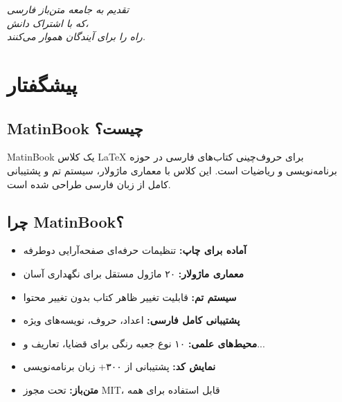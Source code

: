 \documentclass{matinbook}
\begin{document}
    \thispagestyle{empty}
    \vfill
    \begin{flushright}
        {\Large\itshape
            تقدیم به جامعه متن‌باز فارسی\\
            که با اشتراک دانش،\\
            راه را برای آیندگان هموار می‌کنند.
        }
    \end{flushright}
    \clearpage
    \frontmatter
    
    \chapter*{پیشگفتار}
    
    \section*{MatinBook چیست؟}
    
    MatinBook یک کلاس \LaTeX{}
    برای حروف‌چینی کتاب‌های فارسی در حوزه
    برنامه‌نویسی و ریاضیات است. این کلاس
    با معماری ماژولار، سیستم تم و پشتیبانی
    کامل از زبان فارسی طراحی شده است.
    
    \section*{چرا MatinBook؟}
    
    \begin{itemize}
        \item \textbf{آماده برای چاپ:}
        تنظیمات حرفه‌ای صفحه‌آرایی دوطرفه
        
        \item \textbf{معماری ماژولار:}
        ۲۰ ماژول مستقل برای نگهداری آسان
        
        \item \textbf{سیستم تم:}
        قابلیت تغییر ظاهر کتاب بدون تغییر محتوا
        
        \item \textbf{پشتیبانی کامل فارسی:}
        اعداد، حروف، نویسه‌های ویژه
        
        \item \textbf{محیط‌های علمی:}
        ۱۰ نوع جعبه رنگی برای قضایا، تعاریف و...
        
        \item \textbf{نمایش کد:}
        پشتیبانی از ۳۰۰+ زبان برنامه‌نویسی
        
        \item \textbf{متن‌باز:}
        تحت مجوز MIT، قابل استفاده برای همه
    \end{itemize}
    
\end{document}
